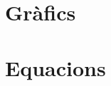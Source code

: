\documentclass[../main.tex]{subfiles}
\begin{document}

\appendix


\chapter{Gràfics} \label{apx:figures}




\chapter{Equacions} \label{apx:eqs}



\end{document}

